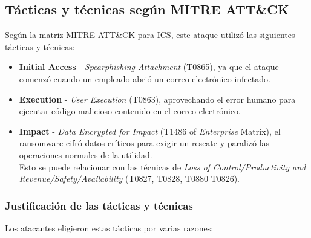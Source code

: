 \subsection{Tácticas y técnicas según MITRE ATT\&CK}
Según la matriz MITRE ATT\&CK para ICS, este ataque utilizó las siguientes tácticas y técnicas:

\begin{itemize}
    \item \textbf{Initial Access} - \textit{Spearphishing Attachment} (T0865), ya que el ataque comenzó cuando un empleado abrió un correo electrónico infectado.
    
    \item \textbf{Execution} - \textit{User Execution} (T0863), aprovechando el error humano para ejecutar código malicioso contenido en el correo electrónico.
    
    \item \textbf{Impact} - \textit{Data Encrypted for Impact} (T1486 of \textit{Enterprise} Matrix), el ransomware cifró datos críticos para exigir un rescate y paralizó las operaciones normales de la utilidad.\\
    Esto se puede relacionar con las técnicas de \textit{Loss of Control/Productivity and Revenue/Safety/Availability} (T0827, T0828, T0880 T0826).
\end{itemize}

\subsubsection{Justificación de las tácticas y técnicas}
Los atacantes eligieron estas tácticas por varias razones:

